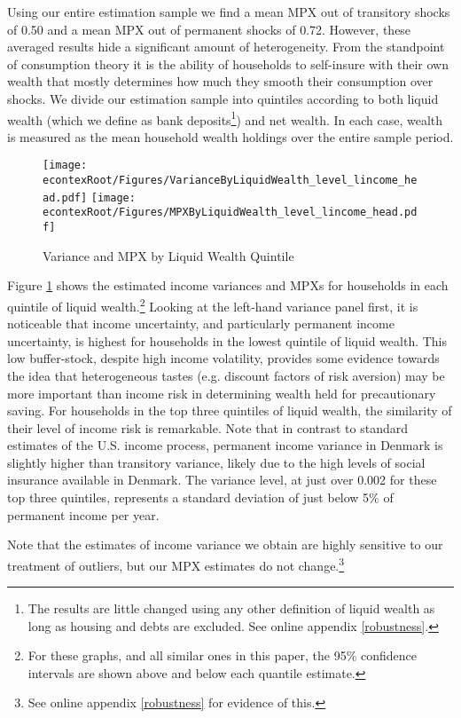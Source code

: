 \documentclass[titlepage]{\econtex}\newcommand{\texname}{ConsumptionHeterogeneity}
\begin{document}
Using our entire estimation sample we find a mean MPX out of transitory shocks of 0.50 and a mean MPX out of permanent shocks of 0.72. However, these averaged results hide a significant amount of heterogeneity. From the standpoint of consumption theory it is the ability of households to self-insure with their own wealth that mostly determines how much they smooth their consumption over shocks. We divide our estimation sample into quintiles according to both liquid wealth (which we define as bank deposits\footnote{The results are little changed using any other definition of liquid wealth as long as housing and debts are excluded. See online appendix \ref{robustness}.}) and net wealth. In each case, wealth is measured as the mean household wealth holdings over the entire sample period.
\begin{figure}
	\centering
	\texttt{[image: \\econtexRoot/Figures/VarianceByLiquidWealth\_level\_lincome\_head.pdf]}
	\centering
	\texttt{[image: \\econtexRoot/Figures/MPXByLiquidWealth\_level\_lincome\_head.pdf]}
	\caption{Variance and MPX by Liquid Wealth Quintile}
	\label{fig:MPXByLiquidWealth}
\end{figure}

Figure \ref{fig:MPXByLiquidWealth} shows the estimated income variances and MPXs for households in each quintile of liquid wealth.\footnote{For these graphs, and all similar ones in this paper, the 95\% confidence intervals are shown above and below each quantile estimate.} Looking at the left-hand variance panel first, it is noticeable that income uncertainty, and particularly permanent income uncertainty, is highest for households in the lowest quintile of liquid wealth. This low buffer-stock, despite high income volatility, provides some evidence towards the idea that heterogeneous tastes (e.g. discount factors of risk aversion) may be more important than income risk in determining wealth held for precautionary saving. For households in the top three quintiles of liquid wealth, the similarity of their level of income risk is remarkable. Note that in contrast to standard estimates of the U.S. income process, permanent income variance in Denmark is slightly higher than transitory variance, likely due to the high levels of social insurance available in Denmark. The variance level, at just over 0.002 for these top three quintiles, represents a standard deviation of just below 5\% of permanent income per year.

Note that the estimates of income variance we obtain are highly sensitive to our treatment of outliers, but our MPX estimates do not change.\footnote{See online appendix \ref{robustness} for evidence of this.}
\end{document}
